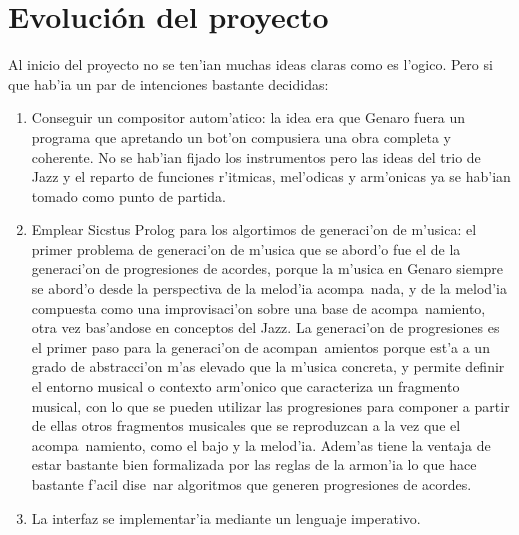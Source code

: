 \documentclass[a4paper,11pt]{article}
\begin{document}
\section{Evoluci\'on del proyecto}
Al inicio del proyecto no se ten'ian muchas ideas claras como es l'ogico. Pero si que hab'ia un par de intenciones bastante decididas:
        \begin{enumerate}
        \item Conseguir un compositor autom'atico: la idea era que Genaro fuera un programa que apretando un bot'on compusiera una obra completa y coherente. No se hab'ian fijado los instrumentos pero las ideas del trio de Jazz y el reparto de funciones r'itmicas, mel'odicas y arm'onicas ya se hab'ian tomado como punto de partida. 
        \item Emplear Sicstus Prolog para los algortimos de generaci'on de m'usica: el primer problema de generaci'on de m'usica que se abord'o fue el de la generaci'on de progresiones de acordes, porque la m'usica en Genaro siempre se abord'o desde la perspectiva de la melod'ia acompa~nada, y de la melod'ia compuesta como una improvisaci'on sobre una base de acompa~namiento, otra vez bas'andose en conceptos del Jazz. 
\newline
La generaci'on de progresiones es el primer paso para la generaci'on de acompan~amientos porque est'a a un grado de abstracci'on m'as elevado que la m'usica concreta, y permite definir el entorno musical o contexto arm'onico que caracteriza un fragmento musical, con lo que se pueden utilizar las progresiones para componer a partir de ellas otros fragmentos musicales que se reproduzcan a la vez que el acompa~namiento, como el bajo y la melod'ia. Adem'as tiene la ventaja de estar bastante bien formalizada por las reglas de la armon'ia lo que hace bastante f'acil dise~nar algoritmos que generen progresiones de acordes.
        \item La interfaz se implementar'ia mediante un lenguaje imperativo.
        \end{enumerate}
\end{document}
